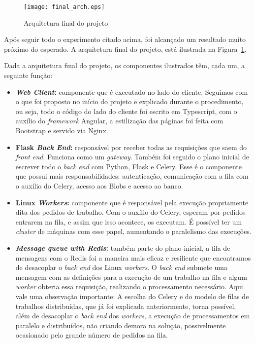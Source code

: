 \documentclass[11pt,twoside]{article}
\begin{document}
\begin{figure}[!h]
  \centering
  \texttt{[image: final\_arch.eps]}
  \caption{Arquitetura final do projeto}
  \label{fig:finalArch}
\end{figure}

Após seguir todo o experimento citado acima, foi alcançado um resultado muito próximo do esperado. A arquitetura final do projeto, está ilustrada na Figura~\ref{fig:finalArch}.

Dada a arquitetura final do projeto, os componentes ilustrados têm, cada um, a seguinte função:

\begin{itemize}
  \item \textbf{\emph{Web Client}:} componente que é executado no lado do cliente. Seguimos com o que foi proposto no início do projeto e explicado durante o procedimento, ou seja, todo o código do lado do cliente 
  foi escrito em Typescript, com o auxílio do \emph{framework} Angular, a estilização das páginas foi feita com Bootstrap e servido via Nginx.
  \item \textbf{Flask \emph{Back End}:} responsável por receber todas as requisições que saem do \emph{front end}. Funciona como um \emph{gateway}. Também foi seguido o plano inicial de escrever todo o \emph{back end} com
  Python, Flask e Celery. Esse é o componente que possui mais responsabilidades: autenticação, comunicação com a fila com o auxílio do Celery, acesso aos Blobs e acesso ao banco.
  \item \textbf{Linux \emph{Workers}:} componente que é responsável pela execução propriamente dita dos pedidos de trabalho. Com o auxílio do Celery, esperam por pedidos entrarem na fila, e assim que isso acontece, os executam. 
  É possível ter um \emph{cluster} de máquinas com esse papel, aumentando o paralelismo das execuções.
  \item \textbf{\emph{Message queue with Redis}:} também parte do plano inicial, a fila de mensagens com o Redis foi a maneira mais eficaz e resiliente que encontramos de desacoplar o \emph{back end} dos Linux \emph{workers}.
  O \emph{back end} submete uma mensagem com as definições para a execução de um trabalho na fila e algum \emph{worker} obteria essa requisição, realizando o processamento necessário. Aqui vale uma observação 
  importante: A escolha do Celery e do modelo de filas de trabalhos distribuídas, que já foi explicada anteriormente, torna possível, além de desacoplar o \emph{back end} dos \emph{workers}, a execução de
  processamentos em paralelo e distribuídos, não criando demora na solução, possivelmente ocasionado pelo grande número de pedidos na fila.
  

\end{itemize}
\end{document}
